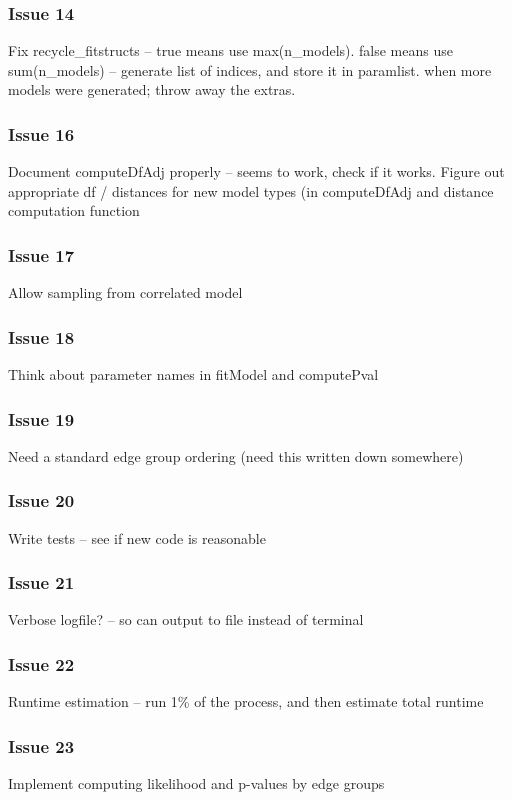 \documentclass[11pt]{article}
\begin{document}
\subsubsection*{Issue 14}
Fix recycle\_fitstructs -- true means use max(n\_models). false means use sum(n\_models) -- generate list of indices, and store it in paramlist. when more models were generated; throw away the extras. 

\subsubsection*{Issue 16}
Document computeDfAdj properly -- seems to work, check if it works. 
Figure out appropriate df / distances for new model types (in computeDfAdj and distance computation function

\subsubsection*{Issue 17}
Allow sampling from correlated model

\subsubsection*{Issue 18}
Think about parameter names in fitModel and computePval

\subsubsection*{Issue 19}
Need a standard edge group ordering (need this written down somewhere)

\subsubsection*{Issue 20}
Write tests -- see if new code is reasonable

\subsubsection*{Issue 21}
Verbose logfile? -- so can output to file instead of terminal

\subsubsection*{Issue 22}
Runtime estimation -- run 1\% of the process, and then estimate total runtime

\subsubsection*{Issue 23}
Implement computing likelihood and p-values by edge groups
\end{document}
